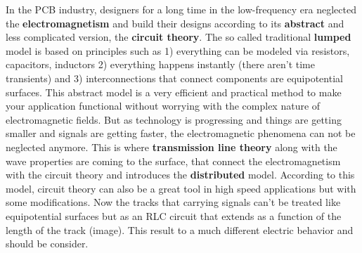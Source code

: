 \documentclass[final]{cubedoc}
\begin{document}
	In the PCB industry, designers for a long time in the low-frequency era neglected the \textbf{electromagnetism} and build their designs according to its \textbf{abstract} and less complicated version, the \textbf{circuit theory}. The so called traditional \textbf{lumped} model is based on principles such as 1) everything can be modeled via resistors, capacitors, inductors 2) everything happens instantly (there aren't time transients) and 3) interconnections that connect components are equipotential surfaces. This abstract model is a very efficient and practical method to make your application functional without worrying with the complex nature of electromagnetic fields. But as technology is progressing and things are getting smaller and signals are getting faster, the electromagnetic phenomena can not be neglected anymore. This is where \textbf{transmission line theory} along with the wave properties are coming to the surface, that connect the electromagnetism with the circuit theory and introduces the \textbf{distributed} model. According to this model, circuit theory can also be a great tool in high speed applications but with some modifications. Now the tracks that carrying signals can't be treated like equipotential surfaces but as an RLC circuit that extends as a function of the length of the track (image). This result to a much different electric behavior and should be consider. 
	
	
	
\end{document}
